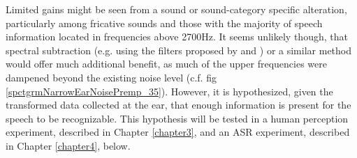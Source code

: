\documentclass[dissertation,copyright]{uathesis}
\begin{document}
Limited gains might be seen from a sound or sound-category specific alteration, particularly among fricative sounds and those with the majority of speech information located in frequencies above 2700Hz.  It seems unlikely though, that spectral subtraction (e.g. using the filters proposed by \cite{hansen:97b} and \cite{reinfeldt:10}) or a similar method would offer much additional benefit, as much of the upper frequencies were dampened beyond the existing noise level (c.f. fig \ref{spctgrmNarrowEarNoisePremp_35}).  However, it is hypothesized, given the transformed data collected at the ear, that enough information is present for the speech to be recognizable.  This hypothesis will be tested in a human perception experiment, described in Chapter \ref{chapter3}, and an ASR experiment, described in Chapter \ref{chapter4}, below.









\end{document}

